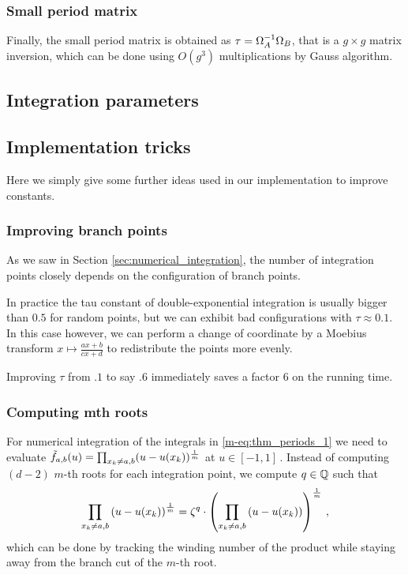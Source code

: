 \documentclass[main.tex]{subfiles}
\begin{document}
   \subsubsection{Small period matrix}

   Finally, the small period matrix is obtained as $\tau=\Omega_A^{-1}\Omega_B$,
   that is a $g\times g$ matrix inversion, which can be done using
   $O(g^3)$ multiplications by Gauss algorithm.

   \subsection{Integration parameters}

   \subsection{Implementation tricks}

   Here we simply give some further ideas used in our implementation to improve constants.

   \subsubsection{Improving branch points}

   As we saw in Section \ref{sec:numerical_integration}, the number of integration points
   closely depends on the configuration of branch points.

   In practice the tau constant of double-exponential integration is usually bigger than $0.5$
   for random points, but we can exhibit bad configurations with $τ\approx 0.1$. In this case
   however, we can perform a change of coordinate by a Moebius transform
   $x\mapsto \frac{ax+b}{cx+d}$ to redistribute the points more evenly.

   Improving $τ$ from $.1$ to say $.6$ immediately saves a factor $6$ on the running time.

  \subsubsection{Computing mth roots}
      
  For numerical integration of the integrals in \eqref{m-eq:thm_periods_1}
  we need to evaluate $\tilde{f}_{a,b}(u) = \prod_{x_k \ne a,b} (u-u(x_k))^{\frac{1}{m}}$ at $u
  \in [-1,1]$\,. Instead of computing $(d-2)$ $m$-th roots for each
  integration point, we compute $q \in \mathbb{Q}$ such that $$\prod_{x_k \ne a,b}
  \left(u - u(x_k) \right)^{\frac{1}{m}} = \zeta^q \cdot \left( \prod_{x_k \ne a,b}
  \left( u - u(x_k) \right) \right)^{\frac{1}{m}} \,,$$ which can be done by tracking
  the winding number of the product while staying away from the branch cut
  of the $m$-th root.
  
\end{document}
